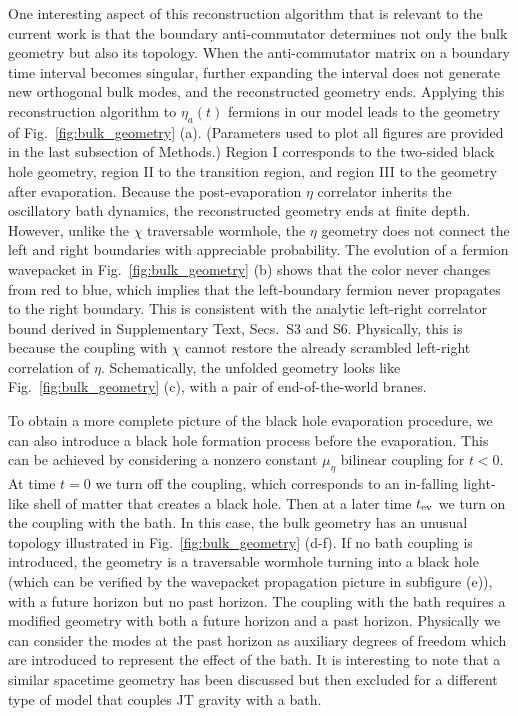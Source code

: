 \documentclass[pdflatex,sn-nature]{sn-jnl}
\begin{document}
One interesting aspect of this reconstruction algorithm that is relevant to the current work is that the boundary anti-commutator determines not only the bulk geometry but also its topology. When the anti-commutator matrix on a boundary time interval becomes singular, further expanding the interval does not generate new orthogonal bulk modes, and the reconstructed geometry ends. Applying this reconstruction algorithm to $\eta_a(t)$ fermions in our model leads to the geometry of Fig.~\ref{fig:bulk_geometry} (a). (Parameters used to plot all figures are provided in the last subsection of Methods.) Region I corresponds to the two-sided black hole geometry, region II to the transition region, and region III to the geometry after evaporation. Because the post-evaporation $\eta$ correlator inherits the oscillatory bath dynamics, the reconstructed geometry ends at finite depth. However, unlike the $\chi$ traversable wormhole, the $\eta$ geometry does not connect the left and right boundaries with appreciable probability. The evolution of a fermion wavepacket in Fig.~\ref{fig:bulk_geometry} (b) shows that the color never changes from red to blue, which implies that the left-boundary fermion never propagates to the right boundary. This is consistent with the analytic left-right correlator bound derived in Supplementary Text, Secs.~S3 and S6. Physically, this is because the coupling with $\chi$ cannot restore the already scrambled left-right correlation of $\eta$. Schematically, the unfolded geometry looks like Fig.~\ref{fig:bulk_geometry} (c), with a pair of end-of-the-world branes.

To obtain a more complete picture of the black hole evaporation procedure, we can also introduce a black hole formation process before the evaporation. This can be achieved by considering a nonzero constant $\mu_\eta$ bilinear coupling for $t<0$. At time $t=0$ we turn off the coupling, which corresponds to an in-falling light-like shell of matter that creates a black hole. Then at a later time $t_{\rm ev}$ we turn on the coupling with the bath. In this case, the bulk geometry has an unusual topology illustrated in Fig.~\ref{fig:bulk_geometry} (d-f). If no bath coupling is introduced, the geometry is a traversable wormhole turning into a black hole (which can be verified by the wavepacket propagation picture in subfigure (e)), with a future horizon but no past horizon. The coupling with the bath requires a modified geometry with both a future horizon and a past horizon. Physically we can consider the modes at the past horizon as auxiliary degrees of freedom which are introduced to represent the effect of the bath. It is interesting to note that a similar spacetime geometry has been discussed but then excluded for a different type of model that couples JT gravity with a bath\cite{almheiri2025}.
\end{document}
